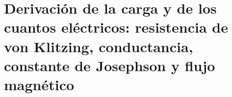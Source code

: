 \chapter{Derivación de la carga y de los cuantos eléctricos: resistencia de von Klitzing, conductancia, constante de Josephson y flujo magnético}
\label{chap:p3-final:40:cuantos_electricos}

